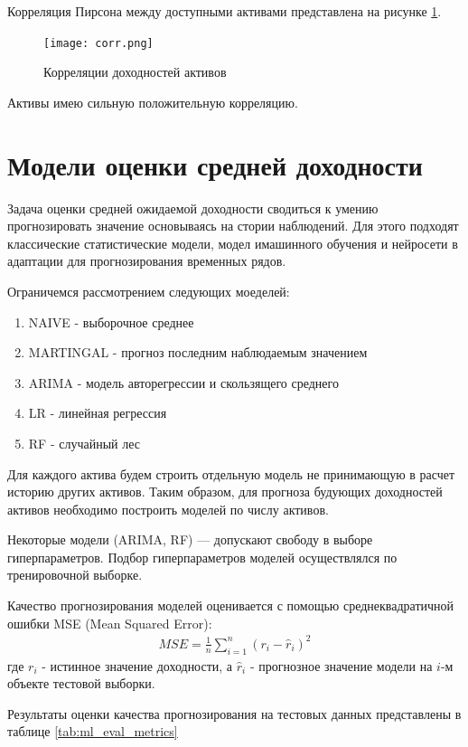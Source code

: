 Корреляция Пирсона между доступными активами представлена на рисунке \ref{fig:corr}.

\begin{figure}[H]
	\centering
	\texttt{[image: corr.png]}
	\caption{Корреляции доходностей активов}
	\label{fig:corr}
\end{figure}

Активы имею сильную положительную корреляцию.

\section{Модели оценки средней доходности}

Задача оценки средней ожидаемой доходности сводиться к умению прогнозировать значение основываясь на стории наблюдений.
Для этого подходят классические статистические модели, модел имашинного обучения и нейросети в адаптации для прогнозирования 
временных рядов.

Ограничемся рассмотрением следующих моеделей:
\begin{enumerate}
	\item NAIVE - выборочное среднее
	\item MARTINGAL - прогноз последним наблюдаемым значением 
	\item ARIMA - модель авторегрессии и скользящего среднего
	\item LR - линейная регрессия
	\item RF - случайный лес
\end{enumerate}

Для каждого актива будем строить отдельную модель не принимающую в расчет историю других активов.
Таким образом, для прогноза будующих доходностей активов необходимо построить моделей по числу активов.

Некоторые модели (ARIMA, RF) --- допускают свободу в выборе гиперпараметров. 
Подбор гиперпараметров моделей осуществлялся по тренировочной выборке.

Качество прогнозирования моделей оценивается с помощью среднеквадратичной ошибки MSE (Mean Squared Error):
\begin{align}
	MSE = \frac{1}{n} \sum_{i=1}^{n} (r_i - \hat{r}_i)^2
\end{align}
где $r_i$ - истинное значение доходности,
а $\hat{r}_i$ - прогнозное значение модели на $i$-м объекте тестовой выборки.

Результаты оценки качества прогнозирования на тестовых данных представлены в таблице \ref{tab:ml_eval_metrics}


